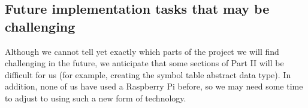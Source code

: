 \documentclass[letterpaper,11pt]{article}
\begin{document}
\subsection{Future implementation tasks that may be challenging}

Although we cannot tell yet exactly which parts of the project we will find challenging in the future, we anticipate that some sections of Part II will be difficult for us (for example, creating the symbol table abstract data type). In addition, none of us have used a Raspberry Pi before, so we may need some time to adjust to using such a new form of technology.
\end{document}
